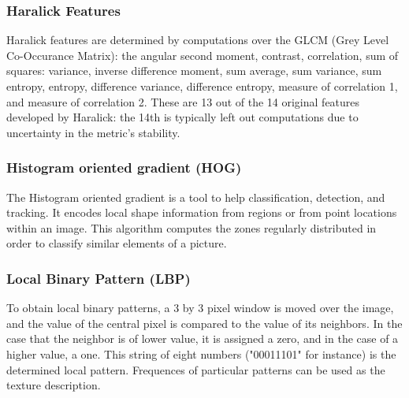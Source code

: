 
\subsubsection{Haralick Features}

Haralick features are determined by computations over the GLCM (Grey Level Co-Occurance Matrix): the angular second moment, contrast, correlation, sum of squares: variance, inverse difference moment, sum average, sum variance, sum entropy, entropy, difference variance, difference entropy, measure of correlation 1, and measure of correlation 2. These are 13 out of the 14 original features developed by Haralick: the 14th is typically left out computations due to uncertainty in the metric's stability. 

\subsubsection{Histogram oriented gradient (HOG)}

The Histogram oriented gradient is a tool to help classification, detection, and tracking. It encodes local shape information from regions or from point locations within an image. This algorithm computes the zones regularly distributed in order to classify similar elements of a picture.

\subsubsection{Local Binary Pattern (LBP)}

To obtain local binary patterns, a 3 by 3 pixel window is moved over the image, and the value of the central pixel is compared to the value of its neighbors. In the case that the neighbor is of lower value, it is assigned a zero, and in the case of a higher value, a one. This string of eight numbers ("00011101" for instance) is the determined local pattern. Frequences of particular patterns can be used as the texture description. 
  
  
